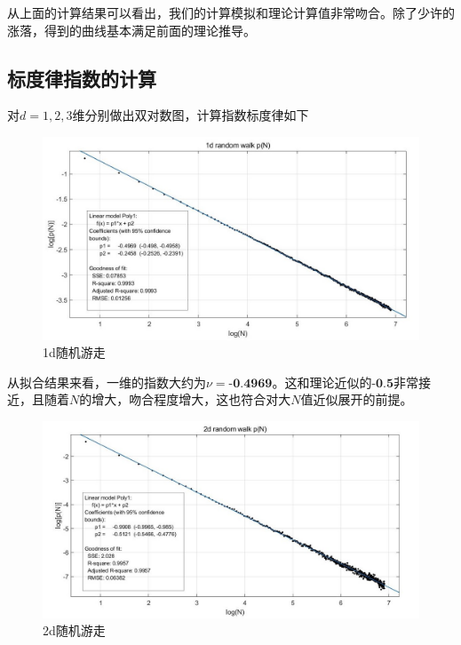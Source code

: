 \documentclass[UTF8]{ctexart}
\begin{document}
	
\begin{flushleft}
		从上面的计算结果可以看出，我们的计算模拟和理论计算值非常吻合。除了少许的涨落，得到的曲线基本满足前面的理论推导。
\end{flushleft}
	
	
	
	\subsection{标度律指数的计算}

	对$d=1,2,3$维分别做出双对数图，计算指数标度律如下
%	
	\begin{figure}[H]
		\centering  %
		\includegraphics[width=6in]{../result_1/curve_1d.jpg}
		\caption{1d随机游走}
	\end{figure}
%	
	\begin{flushleft}
		从拟合结果来看，一维的指数大约为$\nu=\textbf{-0.4969}$。这和理论近似的$\textbf{-0.5}$非常接近，且随着$N$的增大，吻合程度增大，这也符合对大$N$值近似展开的前提。
	\end{flushleft}

	\begin{figure}[H]
		\centering  %
		\includegraphics[width=6in]{../result_1/curve_2d.jpg}
		\caption{2d随机游走}
	\end{figure}
	
\end{document}
